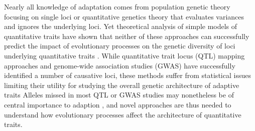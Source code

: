 Nearly all knowledge of adaptation comes from population genetic theory focusing on single loci or quantitative genetics theory that evaluates variances and ignores the underlying loci. Yet theoretical analysis of simple models of quantitative traits have shown that neither of these approaches can successfully predict the impact of evolutionary processes on the genetic diversity of loci underlying quantitative traits \citep{Chevin:2008, LeCorre:2012co}. 
While quantitative trait locus (QTL) mapping approaches and genome-wide association studies (GWAS) have successfully identified a number of causative loci, these methods suffer from statistical issues limiting their utility for studying the overall genetic architecture of adaptive traits \citep{spencer2009designing,Gibson:2012,Thornton:2013} 
Alleles missed in most QTL or GWAS studies may nonetheless be of central importance to adaption \citep{Rockman:2011ej, Mackay:2009}, and novel approaches are thus needed to understand how evolutionary processes affect the architecture of quantitative traits.  

